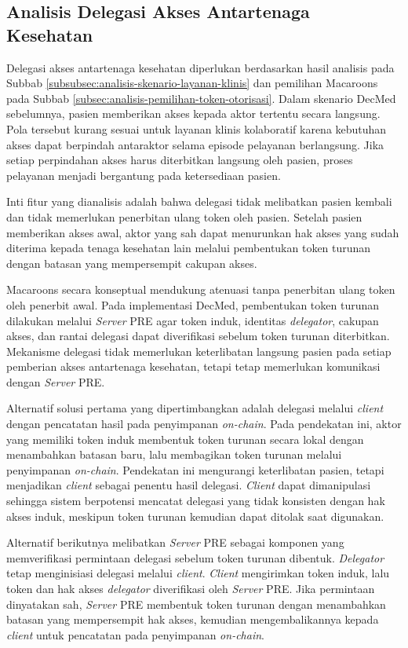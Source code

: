 \subsection{Analisis Delegasi Akses Antartenaga Kesehatan}
\label{subsec:analisis-delegasi-atenuasi-offline}

Delegasi akses antartenaga kesehatan diperlukan berdasarkan hasil analisis pada Subbab \ref{subsubsec:analisis-skenario-layanan-klinis} dan pemilihan Macaroons pada Subbab \ref{subsec:analisis-pemilihan-token-otorisasi}. Dalam skenario DecMed sebelumnya, pasien memberikan akses kepada aktor tertentu secara langsung. Pola tersebut kurang sesuai untuk layanan klinis kolaboratif karena kebutuhan akses dapat berpindah antaraktor selama episode pelayanan berlangsung. Jika setiap perpindahan akses harus diterbitkan langsung oleh pasien, proses pelayanan menjadi bergantung pada ketersediaan pasien.

Inti fitur yang dianalisis adalah bahwa delegasi tidak melibatkan pasien kembali dan tidak memerlukan penerbitan ulang token oleh pasien. Setelah pasien memberikan akses awal, aktor yang sah dapat menurunkan hak akses yang sudah diterima kepada tenaga kesehatan lain melalui pembentukan token turunan dengan batasan yang mempersempit cakupan akses.

Macaroons secara konseptual mendukung atenuasi tanpa penerbitan ulang token oleh penerbit awal. Pada implementasi DecMed, pembentukan token turunan dilakukan melalui \textit{Server} PRE agar token induk, identitas \textit{delegator}, cakupan akses, dan rantai delegasi dapat diverifikasi sebelum token turunan diterbitkan. Mekanisme delegasi tidak memerlukan keterlibatan langsung pasien pada setiap pemberian akses antartenaga kesehatan, tetapi tetap memerlukan komunikasi dengan \textit{Server} PRE.

Alternatif solusi pertama yang dipertimbangkan adalah delegasi melalui \textit{client} dengan pencatatan hasil pada penyimpanan \textit{on-chain}. Pada pendekatan ini, aktor yang memiliki token induk membentuk token turunan secara lokal dengan menambahkan batasan baru, lalu membagikan token turunan melalui penyimpanan \textit{on-chain}. Pendekatan ini mengurangi keterlibatan pasien, tetapi menjadikan \textit{client} sebagai penentu hasil delegasi. \textit{Client} dapat dimanipulasi sehingga sistem berpotensi mencatat delegasi yang tidak konsisten dengan hak akses induk, meskipun token turunan kemudian dapat ditolak saat digunakan.

Alternatif berikutnya melibatkan \textit{Server} PRE sebagai komponen yang memverifikasi permintaan delegasi sebelum token turunan dibentuk. \textit{Delegator} tetap menginisiasi delegasi melalui \textit{client}. \textit{Client} mengirimkan token induk, lalu token dan hak akses \textit{delegator} diverifikasi oleh \textit{Server} PRE. Jika permintaan dinyatakan sah, \textit{Server} PRE membentuk token turunan dengan menambahkan batasan yang mempersempit hak akses, kemudian mengembalikannya kepada \textit{client} untuk pencatatan pada penyimpanan \textit{on-chain}.

